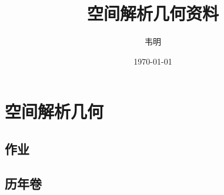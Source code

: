 \documentclass[12pt,lang=en,thmcnt=subsection,pad]{elegantbook}
\title{空间解析几何资料}
\author{韦明}
\date{\today}
\numberwithin{equation}{section}
\begin{document}
\maketitle
\frontmatter

\tableofcontents

\mainmatter
\chapter{空间解析几何}
\section{作业}



\section{历年卷}

\end{document}
